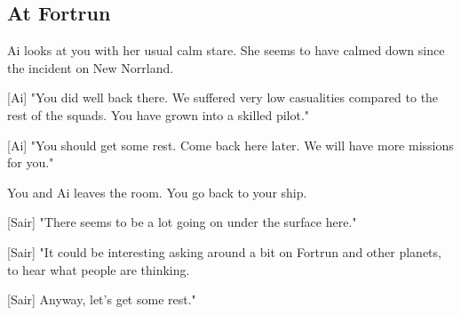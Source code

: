 \documentclass[a4paper,12pt]{article}
\begin{document}
\subsection{At Fortrun}

Ai looks at you with her usual calm stare. She seems to have calmed down since the incident on New Norrland.

[Ai] "You did well back there. We suffered very low casualities compared
to the rest of the squads. You have grown into a skilled pilot." 

[Ai] "You should get some rest. Come back here later. We will have more missions for you."

You and Ai leaves the room. You go back to your ship.

[Sair] "There seems to be a lot going on under the surface here." 

[Sair] "It could be interesting asking around a bit on Fortrun and other planets, to hear what people are thinking. 

[Sair] Anyway, let's get some rest."
\end{document}
